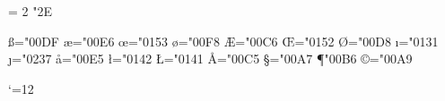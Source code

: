 \protected{} %
\protected\def\}{\ifmmode\rbrace\else\char`\}\fi} %
\let\neq=\ne
\let\le=\leq
\let\ge=\geq
\let\owns=\ni
\let\gets=\leftarrow
\let\to=\rightarrow
\let\hbar=\hslash
\def\cdots{\mathinner{\cdotp\mkern-1mu\cdotp\mkern-1mu\cdotp}}
\Umathchardef \ldotp = 2 \unimathfam "2E
\def\ldots{\mathinner{\ldotp\mkern-1mu\ldotp\mkern-1mu\ldotp}}

\protected\def\leavevmode@ifvmode{\ifvmode\expandafter\indent\fi}
\protected\def\,{\ifmmode\mskip\thinmuskip\else
  \leavevmode@ifvmode\kern.16667em\fi\relax}
\protected\def\>{\ifmmode\mskip\medmuskip\else
  \leavevmode@ifvmode\kern.2222em\fi\relax}
\protected\def\;{\ifmmode\mskip\thickmuskip\else
  \leavevmode@ifvmode\kern.2777em\fi\relax}
\protected\def\!{\ifmmode\mskip-\thinmuskip\else
  \leavevmode@ifvmode\kern-.16667em\fi\relax}
\def\*{\discretionary{\thinspace\hbox{$\times$}}{}{}}

\chardef\ss="00DF
\chardef\ae="00E6
\chardef\oe="0153
\chardef\o="00F8
\chardef\AE="00C6
\chardef\OE="0152
\chardef\O="00D8
\chardef\i="0131 \chardef\j="0237 %
\chardef\aa="00E5
\chardef\l="0142
\chardef\L="0141
\chardef\AA="00C5
\protected\def\dag{\relax\ifmmode\mathord{\dagger}\else\char"2020\fi}
\protected\def\ddag{\relax\ifmmode\mathord{\ddagger}\else\char"2021\fi}
\chardef\S="00A7
\chardef\P"00B6
\chardef\copyright="00A9

\catcode`\@=12
\tenrm
\endinput